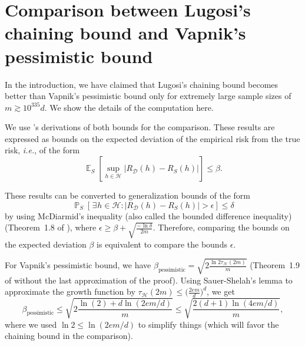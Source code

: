\documentclass[twoside,11pt]{article}
\newcommand{\ie}{\emph{i.e.\xspace}}
\let\oldexists=\exists
\renewcommand{\exists}{\hspace{1pt}\oldexists\hspace{1pt}}
\newcommand{\abs}[1]{\left|#1\right|}
\newcommand{\D}{\mathcal{D}}
\renewcommand{\H}{{\mathcal{H}}}
\DeclareMathOperator*{\Prob}{\mathds{P}}
\newcommand{\prob}[2]{\Prob_{#1}\left[#2\right]}
\DeclareMathOperator*{\Expectation}{\mathds{E}}
\newcommand{\exv}[2]{\Expectation_{#1}\left[#2\right]}
\begin{document}



\newpage

\appendix

\section{Comparison between Lugosi's chaining bound and Vapnik's pessimistic bound}
\label{app:comparison_lugosi}

In the introduction, we have claimed that Lugosi's chaining bound becomes better than Vapnik's pessimistic bound only for extremely large sample sizes of $m \gtrsim 10^{335}d$.
We show the details of the computation here.

We use \citet{lugosi2002pattern}'s derivations of both bounds for the comparison.
These results are expressed as bounds on the expected deviation of the empirical risk from the true risk, \ie, of the form
\begin{equation*}
    \exv{S}{\sup_{h\in\H} \abs{R_\D(h) - R_S(h)}} \le \beta.
\end{equation*}

These results can be converted to generalization bounds of the form
\begin{equation*}
    \prob{S}{\exists h \in \H : \abs{R_\D(h) - R_S(h)} > \epsilon} \le \delta
\end{equation*}
by using McDiarmid's inequality (also called the bounded difference inequality) (Theorem~1.8 of \citet{lugosi2002pattern}), where $\epsilon \ge \beta + \sqrt{\frac{-\ln \delta}{2m}}$.
Therefore, comparing the bounds on the expected deviation $\beta$ is equivalent to compare the bounds $\epsilon$.

For Vapnik's pessimistic bound, we have $\beta_{\text{pessimistic}} = \sqrt{2\frac{\ln 2 \tau_\H(2m)}{m}}$ (Theorem~1.9 of \citet{lugosi2002pattern} without the last approximation of the proof).
Using Sauer-Shelah's lemma to approximate the growth function by $\tau_\H(2m) \le \big(\frac{2em}{d}\big)^d$, we get
\begin{equation*}
    \beta_{\text{pessimistic}} \le \sqrt{2\frac{\ln(2) + d\ln(2em/d)}{m}} \le \sqrt{\frac{2(d+1)\ln(4em/d)}{m}},
\end{equation*}
where we used $\ln 2 \le \ln (2em/d)$ to simplify things (which will favor the chaining bound in the comparison).
\end{document}
